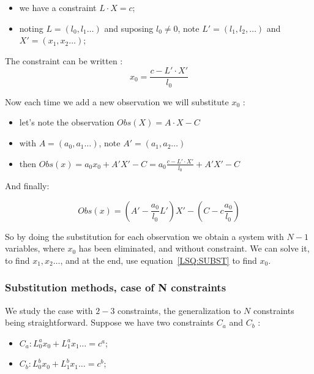 \begin{itemize}
    \item we have a constraint $L \cdot X = c$;
    \item noting $L= (l_0,l_1 \dots)$ and suposing $l_0 \neq 0$,  note $L'=(l_1,l_2, \dots)$ and $X'=(x_1,x_2\dots)$;
\end{itemize}


The constraint can be written :
\begin{equation}
    x_0 = \frac{c-L' \cdot X'}{l_0} \label{LSQ:SUBST}
\end{equation}

Now  each time we add a new observation we will substitute $x_0$ :

\begin{itemize}
      \item let's note the observation  $Obs(X) = A \cdot X - C$
      \item with $A= (a_0,a_1 \dots)$, note  $A' = (a_1,a_2 \dots) $
       \item then   $Obs(x) = a_0 x_0 + A' X'-C= a_0\frac{c-L' \cdot X'}{l_0} + A'X' -C$
\end{itemize}

And finally:

\begin{equation}
    Obs(x) = (A'- \frac{a_0}{l_0} L') X'  - (C -c\frac{a_0}{l_0})
\end{equation}

So by doing the substitution for each observation we obtain a system with $N-1$ variables,
where $x_0$ has been eliminated, and without constraint. We can solve it, to find $x_1, x_2 \dots $,
and at the end, use equation~\ref{LSQ:SUBST} to find $x_0$.



\subsubsection{Substitution methods, case of N constraints}
\label{CSTR:NSUBST}

We study the case with $2-3$ constraints, the generalization to $N$ constraints being straightforward.
Suppose we have two constraints $C_a$ and $C_b$ :

\begin{itemize}
    \item $C_a : L^a_0 x_0 +  L^a_1 x_1 \dots    = c^a$;
    \item $C_b : L^b_0 x_0 +  L^b_1 x_1 \dots    = c^b$;
\end{itemize}

